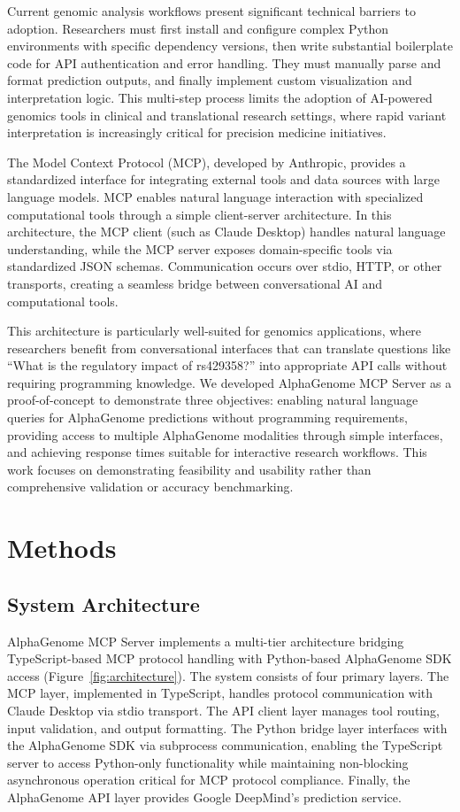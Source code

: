 \documentclass[11pt]{article}
\begin{document}
Current genomic analysis workflows present significant technical barriers to adoption. Researchers must first install and configure complex Python environments with specific dependency versions, then write substantial boilerplate code for API authentication and error handling. They must manually parse and format prediction outputs, and finally implement custom visualization and interpretation logic. This multi-step process limits the adoption of AI-powered genomics tools in clinical and translational research settings, where rapid variant interpretation is increasingly critical for precision medicine initiatives.

The Model Context Protocol (MCP), developed by Anthropic, provides a standardized interface for integrating external tools and data sources with large language models. MCP enables natural language interaction with specialized computational tools through a simple client-server architecture. In this architecture, the MCP client (such as Claude Desktop) handles natural language understanding, while the MCP server exposes domain-specific tools via standardized JSON schemas. Communication occurs over stdio, HTTP, or other transports, creating a seamless bridge between conversational AI and computational tools.

This architecture is particularly well-suited for genomics applications, where researchers benefit from conversational interfaces that can translate questions like ``What is the regulatory impact of rs429358?'' into appropriate API calls without requiring programming knowledge. We developed AlphaGenome MCP Server as a proof-of-concept to demonstrate three objectives: enabling natural language queries for AlphaGenome predictions without programming requirements, providing access to multiple AlphaGenome modalities through simple interfaces, and achieving response times suitable for interactive research workflows. This work focuses on demonstrating feasibility and usability rather than comprehensive validation or accuracy benchmarking.

\section{Methods}

\subsection{System Architecture}

AlphaGenome MCP Server implements a multi-tier architecture bridging TypeScript-based MCP protocol handling with Python-based AlphaGenome SDK access (Figure~\ref{fig:architecture}). The system consists of four primary layers. The MCP layer, implemented in TypeScript, handles protocol communication with Claude Desktop via stdio transport. The API client layer manages tool routing, input validation, and output formatting. The Python bridge layer interfaces with the AlphaGenome SDK via subprocess communication, enabling the TypeScript server to access Python-only functionality while maintaining non-blocking asynchronous operation critical for MCP protocol compliance. Finally, the AlphaGenome API layer provides Google DeepMind's prediction service.
\end{document}

